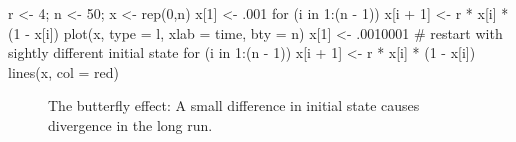 \documentclass[
  a4paper,
  DIV=11,
  numbers=noendperiod,
  oneside]{scrreprt}
\newenvironment{Shaded}{}{}
\newcommand{\AttributeTok}[1]{\textcolor[rgb]{0.84,0.23,0.29}{#1}}
\newcommand{\CommentTok}[1]{\textcolor[rgb]{0.42,0.45,0.49}{#1}}
\newcommand{\ControlFlowTok}[1]{\textcolor[rgb]{0.84,0.23,0.29}{#1}}
\newcommand{\DecValTok}[1]{\textcolor[rgb]{0.00,0.36,0.77}{#1}}
\newcommand{\FunctionTok}[1]{\textcolor[rgb]{0.44,0.26,0.76}{#1}}
\newcommand{\NormalTok}[1]{\textcolor[rgb]{0.14,0.16,0.18}{#1}}
\newcommand{\OtherTok}[1]{\textcolor[rgb]{0.44,0.26,0.76}{#1}}
\newcommand{\SpecialCharTok}[1]{\textcolor[rgb]{0.00,0.36,0.77}{#1}}
\newcommand{\StringTok}[1]{\textcolor[rgb]{0.01,0.18,0.38}{#1}}
\begin{document}
\begin{Shaded}
\begin{Highlighting}[]
\NormalTok{r }\OtherTok{\textless{}{-}} \DecValTok{4}\NormalTok{;  n }\OtherTok{\textless{}{-}} \DecValTok{50}\NormalTok{; x }\OtherTok{\textless{}{-}} \FunctionTok{rep}\NormalTok{(}\DecValTok{0}\NormalTok{,n)}
\NormalTok{x[}\DecValTok{1}\NormalTok{] }\OtherTok{\textless{}{-}}\NormalTok{ .}\DecValTok{001}
\ControlFlowTok{for}\NormalTok{ (i }\ControlFlowTok{in} \DecValTok{1}\SpecialCharTok{:}\NormalTok{(n }\SpecialCharTok{{-}} \DecValTok{1}\NormalTok{))}
\NormalTok{  x[i }\SpecialCharTok{+} \DecValTok{1}\NormalTok{] }\OtherTok{\textless{}{-}}\NormalTok{ r }\SpecialCharTok{*}\NormalTok{ x[i] }\SpecialCharTok{*}\NormalTok{ (}\DecValTok{1} \SpecialCharTok{{-}}\NormalTok{ x[i])}
\FunctionTok{plot}\NormalTok{(x, }\AttributeTok{type =} \StringTok{\textquotesingle{}l\textquotesingle{}}\NormalTok{, }\AttributeTok{xlab =} \StringTok{\textquotesingle{}time\textquotesingle{}}\NormalTok{, }\AttributeTok{bty =} \StringTok{\textquotesingle{}n\textquotesingle{}}\NormalTok{)}
\NormalTok{x[}\DecValTok{1}\NormalTok{] }\OtherTok{\textless{}{-}}\NormalTok{ .}\DecValTok{0010001}
\CommentTok{\# restart with sightly different initial state}
\ControlFlowTok{for}\NormalTok{ (i }\ControlFlowTok{in} \DecValTok{1}\SpecialCharTok{:}\NormalTok{(n }\SpecialCharTok{{-}} \DecValTok{1}\NormalTok{))}
\NormalTok{  x[i }\SpecialCharTok{+} \DecValTok{1}\NormalTok{] }\OtherTok{\textless{}{-}}\NormalTok{ r }\SpecialCharTok{*}\NormalTok{ x[i] }\SpecialCharTok{*}\NormalTok{ (}\DecValTok{1} \SpecialCharTok{{-}}\NormalTok{ x[i])}
\FunctionTok{lines}\NormalTok{(x, }\AttributeTok{col =} \StringTok{\textquotesingle{}red\textquotesingle{}}\NormalTok{)}
\end{Highlighting}
\end{Shaded}

\begin{figure}


\caption{\label{fig-ch2-img6}The butterfly effect: A small difference in
initial state causes divergence in the long run.}

\end{figure}%
\end{document}
